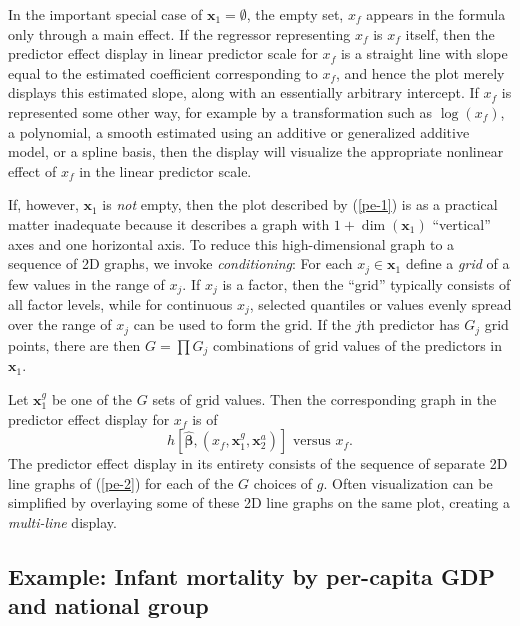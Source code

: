 \documentclass[article]{jss}
\newcommand{\x}{\mathbf{x}}
\newcommand{\bbetahat}{\widehat{\boldsymbol{\beta}}}
\begin{document}
In the important special case of $\x_1=\emptyset$, the empty set, $x_f$ appears in the formula only through a main effect.  If the regressor representing $x_f$ is $x_f$ itself, then the predictor effect display in linear predictor scale for $x_f$  is a straight line with slope equal to the estimated coefficient corresponding to $x_f$, and hence the plot merely displays this estimated slope, along with an essentially arbitrary intercept.  If $x_f$ is represented some other way, for example by a transformation such as $\log(x_f)$, a polynomial, a smooth estimated using an additive or generalized additive model, or a spline basis, then the display will visualize the appropriate nonlinear effect of $x_f$ in the linear predictor scale.

If, however, $\x_1$ is \emph{not} empty, then the plot described by (\ref{pe-1}) is as a practical matter inadequate because it describes a graph with $1 + \dim(\x_1)$ ``vertical'' axes and one horizontal axis.  To reduce this high-dimensional graph to a sequence of 2D graphs, we invoke  \emph{conditioning}:  For each $x_j \in \x_{1}$ define a \emph{grid} of a few values in the range of $x_j$.  If $x_j$ is a factor, then the ``grid'' typically consists of all factor levels, while for continuous $x_j$, selected quantiles or values evenly spread over the range of $x_j$ can be used to form the grid.  If the $j$th predictor has $G_j$ grid points, there are then $G=\prod G_j$ combinations of grid values of the predictors in $\x_1$.

Let $\x_{1}^g$ be one of the $G$ sets of grid values. Then the corresponding graph in the predictor effect display for $x_f$ is of
\begin{equation}
h\left[\bbetahat, (x_f, \x_1^g, \x_2^a)\right]  \textrm{ versus } x_{f}. \label{pe-2}
\end{equation}
The predictor effect display in its entirety consists of the sequence of separate 2D line graphs of (\ref{pe-2}) for each of the $G$ choices of $g$.  Often visualization can be simplified by overlaying some of these 2D line graphs on the same plot, creating a \emph{multi-line} display.

\subsection{Example: Infant mortality by per-capita GDP and national group}\label{sec-preliminary-example}
\end{document}
